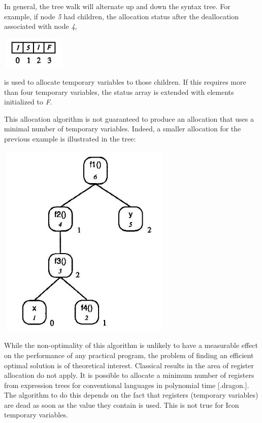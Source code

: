 In general, the tree walk will alternate up and down the syntax
tree. For example, if node \textit{5} had children, the allocation
status after the deallocation associated with node \textit{4},

{\centering{}
 \includegraphics[width=1.2in,height=0.6in]{kw/figure8-6-5.png}  
\par}

\noindent is used to allocate temporary variables to those
children. If this requires more than four temporary variables, the
status array is extended with elements initialized to \textit{F}.

This allocation algorithm is not guaranteed to produce an allocation
that uses a minimal number of temporary variables.  Indeed, a smaller
allocation for the previous example is illustrated in the tree:

{\centering{}
\includegraphics[width=3.3in,height=3.7in]{kw/figure8-7.png}  
\par}


While the non-optimality of this algorithm is unlikely to have a
measurable effect on the performance of any practical program, the
problem of finding an efficient optimal solution is of theoretical
interest. Classical results in the area of register allocation do not
apply. It is possible to allocate a minimum number of registers from
expression trees for conventional languages in polynomial time
[.dragon.]. The algorithm to do this depends on the fact that
registers (temporary variables) are dead as soon as the value they
contain is used. This is not true for Icon temporary variables.

